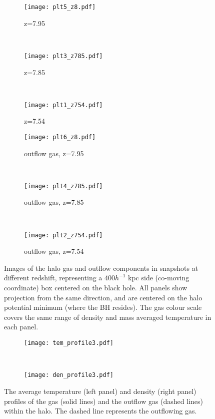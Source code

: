 \documentclass[a4paper,usenatbib]{mnras}
\begin{document}
\begin{figure*}

    \begin{subfigure}[b]{0.3\textwidth}
        \texttt{[image: plt5\_z8.pdf]}
        \caption{z=7.95}
        \label{fig:b1}
    \end{subfigure}
    ~  
    \begin{subfigure}[b]{0.3\textwidth}
        \texttt{[image: plt3\_z785.pdf]}
        \caption{z=7.85}
        \label{fig:b2}
    \end{subfigure}
    ~
    \begin{subfigure}[b]{0.3\textwidth}
        \texttt{[image: plt1\_z754.pdf]}
        \caption{z=7.54}
    \end{subfigure}
    
    \begin{subfigure}[b]{0.3\textwidth}
        \texttt{[image: plt6\_z8.pdf]}
        \caption{outflow gas, z=7.95}
    \end{subfigure}
    ~
    \begin{subfigure}[b]{0.3\textwidth}
        \texttt{[image: plt4\_z785.pdf]}
        \caption{outflow gas, z=7.85}
    \end{subfigure}
    ~
    \begin{subfigure}[b]{0.3\textwidth}
        \texttt{[image: plt2\_z754.pdf]}
        \caption{outflow gas, z=7.54}
    \end{subfigure}
        
    \caption{Images of the halo gas and outflow components in snapshots at different redshift, representing a $400h^{-1}$ kpc side (co-moving coordinate) box centered on the black hole. All panels show projection from the same direction, and are centered on the halo potential minimum (where the BH resides). The gas colour scale covers the  same range of density and mass averaged temperature in each panel.}
    \label{fig:figure5}
\end{figure*}


\begin{figure*}

    \begin{subfigure}[b]{0.4\textwidth}
 \texttt{[image: tem\_profile3.pdf]}
        \label{fig:c2}
    \end{subfigure}
    ~
    \begin{subfigure}[b]{0.4\textwidth}
 \texttt{[image: den\_profile3.pdf]}
        \label{fig:c3}
    \end{subfigure}
    \caption{The average temperature (left panel) and density (right panel) profiles of the gas (solid lines) and the outflow gas (dashed lines) within the halo. The dashed line represents the outflowing gas.}
    \label{fig:figure6}
\end{figure*}
\end{document}
